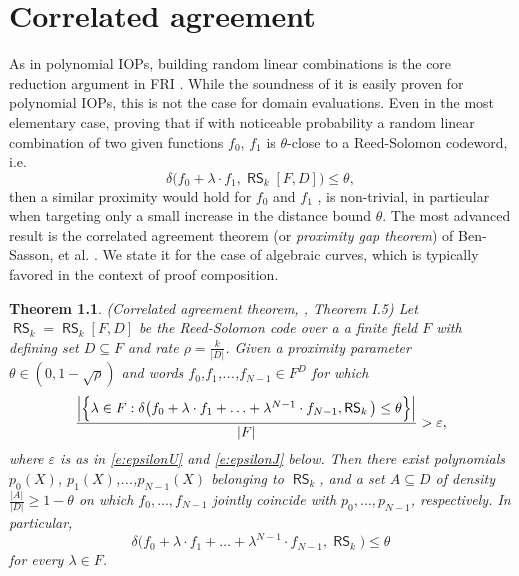 \documentclass[11pt,article,oneside]{memoir}
\newtheorem{thm}{Theorem}[]
\theoremstyle{definition}
\theoremstyle{remark}
\DeclareMathOperator{\RS}{\mathsf{RS}}
\begin{document}
\chapter{Correlated agreement}

As in polynomial IOPs, building random linear combinations is the core reduction argument in FRI . 
While the soundness of it is easily proven for polynomial IOPs, this is not the case for domain evaluations. 
Even in the most elementary case, proving that if with noticeable probability a random linear combination  of two  given functions $f_0$, $f_1$ is $\theta$-close to a Reed-Solomon codeword, i.e.
\[
\delta\big(f_0 + \lambda\cdot f_1, \RS_k[F,D]\big) \leq \theta,
\]
 then a similar proximity  would hold for $f_0$ and $f_1$ , is non-trivial, in particular when targeting only a small increase in the distance bound $\theta$.  
The most advanced result is the correlated agreement theorem (or \textit{proximity gap theorem}) of Ben-Sasson, et al. \cite{ProximityGaps}.
We state it for the case of algebraic curves, which is typically favored in the context of proof composition.

\begin{thm}
\label{thm:CorrelatedAgreement}
(Correlated agreement theorem, \cite{ProximityGaps}, Theorem I.5)
Let $\RS_k = \RS_k[F,D]$ be the Reed-Solomon code over a a finite field $F$ with defining set $D\subseteq F$ and rate $\rho=\frac{k}{|D|}$.
Given a proximity parameter $\theta\in (0,1-\sqrt\rho)$  and words $f_0$,$f_1$,...,$f_{N-1}\in F^D$ for which
\begin{equation*}
\frac{%
	\Big|\Big\{\lambda\in F : \delta\big(f_0 + \lambda\cdot f_1 + \ldots + \lambda^{N-1}\cdot f_{N-1}, \RS_k\big) \leq \theta \Big\} \Big|
}{|F|} > \varepsilon,
\end{equation*}
where $\varepsilon$ is as in \eqref{e:epsilonU} and \eqref{e:epsilonJ}  below.
Then there exist polynomials $p_0(X)$, $p_1(X)$,...,$p_{N-1}(X)$ belonging to $\RS_k$, and a set $A\subseteq D$ of density 
$
\frac{|A|}{|D|}\geq 1 - \theta
$ 
on which $f_0, \ldots, f_{N-1}$ jointly coincide with $p_0, \ldots, p_{N-1}$, respectively. 
In particular, 
\begin{equation*}
\delta\big(f_0 + \lambda\cdot f_1 + \ldots + \lambda^{N-1}\cdot f_{N-1}, \RS_k\big) \leq \theta
\end{equation*}
for every $\lambda\in F$. 
\end{thm}
\end{document}
